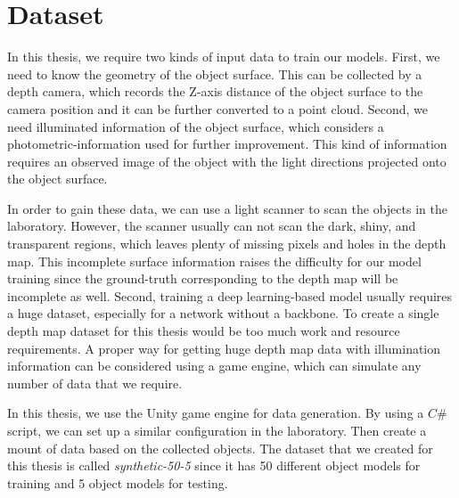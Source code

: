 
\chapter{Dataset} %

\label{ch:04} %


 In this thesis, we require two kinds of input data to train our models. 
First, we need to know the geometry of the object surface. This can be collected by a depth camera, which records the Z-axis distance of the object surface to the camera position and it can be further converted to a point cloud. 
Second, we need illuminated information of the object surface, which considers a photometric-information used for further improvement. 
This kind of information requires an observed image of the object with the light directions projected onto the object surface. 

In order to gain these data, we can use a light scanner to scan the objects in the laboratory. However, the scanner usually can not scan the dark, shiny, and transparent regions, which leaves plenty of missing pixels and holes in the depth map. This incomplete surface information raises the difficulty for our model training since the ground-truth corresponding to the depth map will be incomplete as well. Second, training a deep learning-based model usually requires a huge dataset, especially for a network without a backbone. To create a single depth map dataset for this thesis would be too much work and resource requirements. A proper way for getting huge depth map data with illumination information can be considered using a game engine, which can simulate any number of data that we require.

In this thesis, we use the Unity game engine for data generation. By using a $ C\# $ script, we can set up a similar configuration in the laboratory. Then create a mount of data based on the collected objects. The dataset that we created for this thesis is called \textit{synthetic-50-5} since it has 50 different object models for training and 5 object models for testing.



